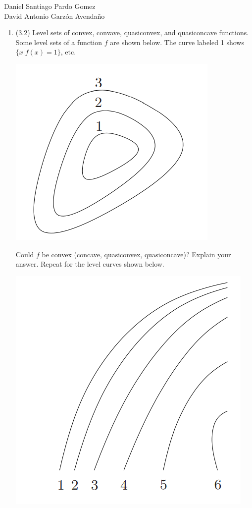\documentclass[12pt, oneside]{article}%
\begin{document}
\vspace{0.5cm}
\normalfont
\textsf{} 
\normalsize
Daniel Santiago Pardo Gomez\\
David Antonio Garzón Avendaño
\dotfill
\begin{enumerate}
\item (3.2) Level sets of convex, convave, quasiconvex, and quasiconcave functions.  Some level sets of a function $f$ are shown below. The curve labeled 1 shows $\{x | f(x) = 1\}$, etc.
\begin{center}
    \includegraphics[scale=0.6]{img1.png}
\end{center}
Could $f$ be convex (concave, quasiconvex, quasiconcave)? Explain your answer. Repeat for the level curves shown below.
\begin{center}
    \includegraphics[scale=0.5]{img2.png}
\end{center}


\end{enumerate}
\end{document}
